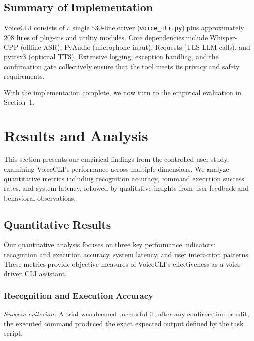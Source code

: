 \documentclass[a4paper,12pt]{article}
\begin{document}
\subsection{Summary of Implementation}
\noindent VoiceCLI consists of a single 530-line driver (\texttt{voice\_cli.py}) plus approximately 208 lines of plug-ins and utility modules. Core dependencies include Whisper-CPP (offline ASR), PyAudio (microphone input), Requests (TLS LLM calls), and pyttsx3 (optional TTS). Extensive logging, exception handling, and the confirmation gate collectively ensure that the tool meets its privacy and safety requirements.

With the implementation complete, we now turn to the empirical evaluation in Section~\ref{sec:results}.
\newpage







\newpage
\section{Results and Analysis}
\label{sec:results}

This section presents our empirical findings from the controlled user study, examining VoiceCLI's performance across multiple dimensions. We analyze quantitative metrics including recognition accuracy, command execution success rates, and system latency, followed by qualitative insights from user feedback and behavioral observations.

\subsection{Quantitative Results}

Our quantitative analysis focuses on three key performance indicators: recognition and execution accuracy, system latency, and user interaction patterns. These metrics provide objective measures of VoiceCLI's effectiveness as a voice-driven CLI assistant.

\subsubsection{Recognition and Execution Accuracy}
\textit{Success criterion:} A trial was deemed successful if, after any confirmation or edit, the executed command produced the exact expected output defined by the task script.
\end{document}
